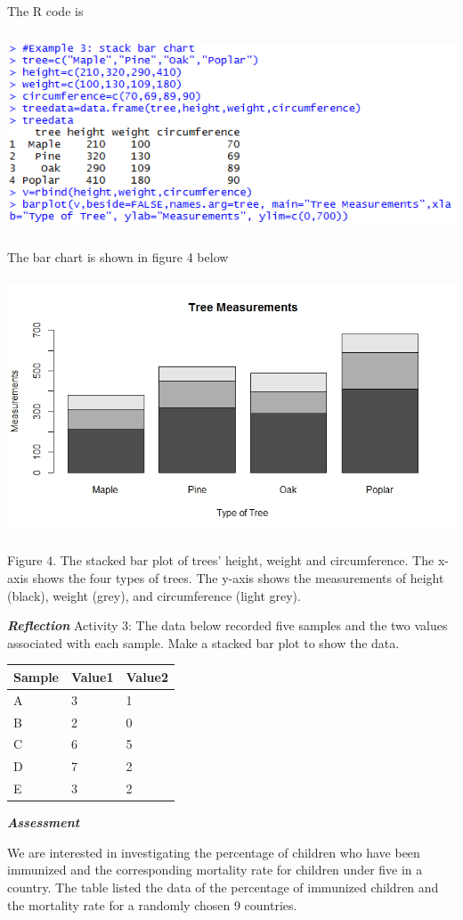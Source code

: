 The R code is

\includegraphics[width=5.84375in,height=2.33333in]{media/image6.png}

The bar chart is shown in figure 4 below

\includegraphics[width=5.45349in,height=3in]{media/image7.jpeg}

Figure 4. The stacked bar plot of trees' height, weight and
circumference. The x-axis shows the four types of trees. The y-axis
shows the measurements of height (black), weight (grey), and
circumference (light grey).

\emph{\textbf{Reflection}} Activity 3: The data below recorded five
samples and the two values associated with each sample. Make a stacked
bar plot to show the data.

\begin{longtable}[]{@{}lll@{}}
\toprule
Sample & Value1 & Value2\tabularnewline
\midrule
\endhead
A & 3 & 1\tabularnewline
B & 2 & 0\tabularnewline
C & 6 & 5\tabularnewline
D & 7 & 2\tabularnewline
E & 3 & 2\tabularnewline
\bottomrule
\end{longtable}

\emph{\textbf{Assessment}}

We are interested in investigating the percentage of children who have
been immunized and the corresponding mortality rate for children under
five in a country. The table listed the data of the percentage of
immunized children and the mortality rate for a randomly chosen 9
countries.

